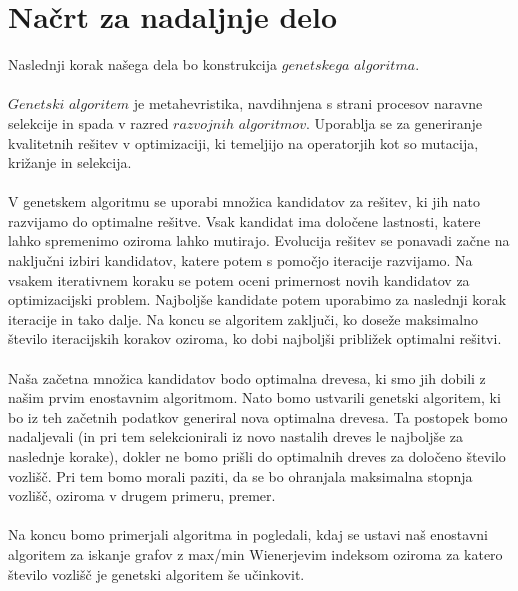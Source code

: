 \documentclass[a4paper]{article}
\begin{document}
\section{Načrt za nadaljnje delo}

Naslednji korak našega dela bo konstrukcija $genetskega$ $algoritma$.
\\
\\
$Genetski$ $algoritem$ je metahevristika, navdihnjena s strani procesov naravne selekcije in spada v razred $razvojnih$
$algoritmov$. Uporablja se za generiranje kvalitetnih rešitev v optimizaciji, ki temeljijo na operatorjih kot so mutacija, križanje
in selekcija.  
\\
\\
V genetskem algoritmu se uporabi množica kandidatov za rešitev, ki jih nato razvijamo do optimalne rešitve. Vsak kandidat
ima določene lastnosti, katere lahko spremenimo oziroma lahko mutirajo. Evolucija rešitev se ponavadi začne na naključni izbiri kandidatov,
katere potem s pomočjo iteracije razvijamo. Na vsakem iterativnem koraku se potem oceni primernost novih kandidatov za optimizacijski
problem. Najboljše kandidate potem uporabimo za naslednji korak iteracije in tako dalje. Na koncu se algoritem zaključi,
ko doseže maksimalno število iteracijskih korakov oziroma, ko dobi najboljši približek optimalni rešitvi.
\\
\\
Naša začetna množica kandidatov bodo optimalna drevesa, ki smo jih dobili z našim prvim enostavnim algoritmom. 
Nato bomo ustvarili genetski algoritem, ki bo iz teh začetnih podatkov generiral nova optimalna drevesa. Ta postopek bomo
nadaljevali (in pri tem selekcionirali iz novo nastalih dreves le najboljše za naslednje korake), dokler ne bomo prišli do optimalnih 
dreves za določeno število vozlišč. Pri tem bomo morali paziti, da se bo ohranjala maksimalna stopnja vozlišč, 
oziroma v drugem primeru, premer. 
\\
\\
Na koncu bomo primerjali algoritma in pogledali, kdaj se ustavi naš enostavni algoritem za iskanje grafov z max/min Wienerjevim indeksom
oziroma za katero število vozlišč je genetski algoritem še učinkovit.
\end{document}
